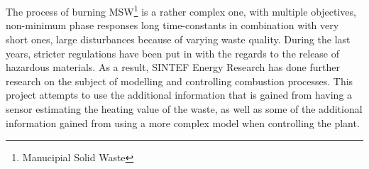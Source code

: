 \chapter*{\englishabstractname}
%
%

\clearpage


The process of burning MSW\footnote{Manucipial Solid Waste} is a rather complex one, with multiple objectives, non-minimum phase responses long time-constants in combination with very short ones, large disturbances because of varying waste quality. During the last years, stricter regulations have been put in with the regards to the release of hazardous materials. As a result, SINTEF Energy Research has done further research on the subject of modelling and controlling combustion processes. This project attempts to use the additional information that is gained from having a sensor estimating the heating value of the waste, as well as some of the additional information gained from using a more complex model when controlling the plant.